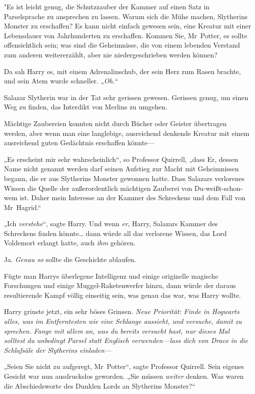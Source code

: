 {"Es ist leicht genug, die Schutzzauber der Kammer auf einen Satz in Parselsprache zu ansprechen zu lassen. Warum sich die Mühe machen, Slytherins Monster zu erschaffen? Es kann nicht einfach gewesen sein, eine Kreatur mit einer Lebensdauer von Jahrhunderten zu erschaffen. Kommen Sie, Mr~Potter, es sollte offensichtlich sein; was sind die Geheimnisse, die von einem lebenden Verstand zum anderen weitererzählt, aber nie niedergeschrieben werden können?

Da sah Harry es, mit einem Adrenalinschub, der sein Herz zum Rasen brachte, und sein Atem wurde schneller. „\emph{Oh.}“

Salazar Slytherin war in der Tat sehr gerissen gewesen. Gerissen genug, um einen Weg zu finden, das Interdikt von Merlins zu umgehen.

Mächtige Zaubereien konnten nicht durch Bücher oder Geister übertragen werden, aber wenn man eine langlebige, ausreichend denkende Kreatur mit einem ausreichend guten Gedächtnis erschaffen könnte—

„Es erscheint mir sehr wahrscheinlich“, so Professor Quirrell, „dass Er, dessen Name nicht genannt werden darf seinen Aufstieg zur Macht mit Geheimnissen begann, die er aus Slytherins Monster gewonnen hatte. Dass Salazars verlorenes Wissen die Quelle der außerordentlich mächtigen Zauberei von Du-weißt-schon-wem ist. Daher mein Interesse an der Kammer des Schreckens und dem Fall von Mr~Hagrid.“

„Ich \emph{verstehe}“, sagte Harry. Und wenn \emph{er}, Harry, Salazars Kammer des Schreckens finden könnte… dann würde all das verlorene Wissen, das Lord Voldemort erlangt hatte, auch \emph{ihm} gehören.

Ja. \emph{Genau so} sollte die Geschichte ablaufen.

Fügte man Harrys überlegene Intelligenz und einige originelle magische Forschungen und einige Muggel-Raketenwerfer hinzu, dann würde der daraus resultierende Kampf völlig einseitig sein, was genau das war, was Harry wollte.

Harry grinste jetzt, ein sehr böses Grinsen. \emph{Neue Priorität: Finde in Hogwarts alles, was im Entferntesten wie eine Schlange aussieht, und versuche, damit zu sprechen. Fange mit allem an, was du bereits versucht hast, nur dieses Mal solltest du unbedingt} \emph{Parsel} \emph{statt Englisch verwenden—lass dich von Draco in die Schlafsäle der Slytherins einladen—}

„Seien Sie nicht zu aufgeregt, Mr~Potter“, sagte Professor Quirrell. Sein eigenes Gesicht war nun ausdruckslos geworden. „Sie müssen \emph{weiter} denken. Was waren die Abschiedsworte des Dunklen Lords an Slytherins Monster?“

}

